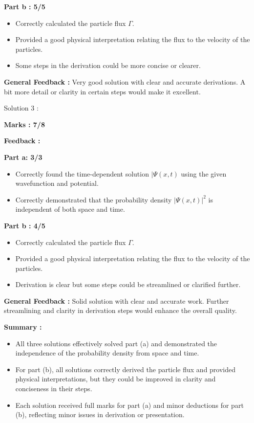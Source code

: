 \documentclass[a4paper,11pt]{article}
\begin{document}
\textbf{Part b : 5/5}

\begin{itemize}
    \item Correctly calculated the particle flux $\Gamma$.
    \item Provided a good physical interpretation relating the flux to the velocity of the particles.
    \item Some steps in the derivation could be more concise or clearer.
\end{itemize}

\textbf{General Feedback :}
Very good solution with clear and accurate derivations. A bit more detail or clarity in certain steps would make it excellent.


Solution 3 :

\textbf{Marks : 7/8}

\textbf{Feedback :}

\textbf{Part a: 3/3}
\begin{itemize}
    \item Correctly found the time-dependent solution $|\Psi (x,t)$ using the given wavefunction and potential.
    \item Correctly demonstrated that the probability density $|\Psi (x,t)|^2$ is independent of both space and time.
\end{itemize}

\textbf{Part b : 4/5}

\begin{itemize}
    \item Correctly calculated the particle flux $\Gamma$.
    \item Provided a good physical interpretation relating the flux to the velocity of the particles.
    \item Derivation is clear but some steps could be streamlined or clarified further.
\end{itemize}

\textbf{General Feedback :}
Solid solution with clear and accurate work. Further streamlining and clarity in derivation steps would enhance the overall quality.

\textbf{Summary :}
\begin{itemize}
    \item All three solutions effectively solved part (a) and demonstrated the independence of the probability density from space and time.
    \item For part (b), all solutions correctly derived the particle flux and provided physical interpretations, but they could be improved in clarity and conciseness in their steps.
    \item Each solution received full marks for part (a) and minor deductions for part (b), reflecting minor issues in derivation or presentation.
\end{itemize}
\end{document}
